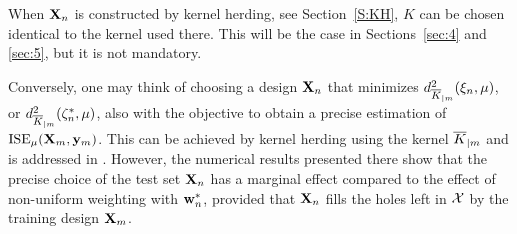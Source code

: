 \begin{remark}
When ${\bf X}_n$ is constructed by kernel herding, see Section~\ref{S:KH}, $K$ can be chosen identical to the kernel used there. This will be the case in Sections~\ref{sec:4} and \ref{sec:5}, but it is not mandatory. 

Conversely, one may think of choosing a design ${\bf X}_n$ that minimizes $d_{\overline{K}_{|m}}^2(\xi_n,\mu)$, or $d_{\overline{K}_{|m}}^2(\zeta_n^*,\mu)$, also with the objective to obtain a precise estimation of $\mathrm{ISE}_\mu({\bf X}_m,{\bf y}_m)$. This can be achieved by kernel herding using the kernel $\overline{K}_{|m}$ and is addressed in \cite{PR2021a}. However, the numerical results presented there show that the precise choice of the test set ${\bf X}_n$ has a marginal effect compared to the effect of non-uniform weighting with $\mathbf{w}_n^*$, provided that ${\bf X}_n$ fills the holes left in $\mathcal{X}$ by the training design ${\bf X}_m$.
\fin
\end{remark}

